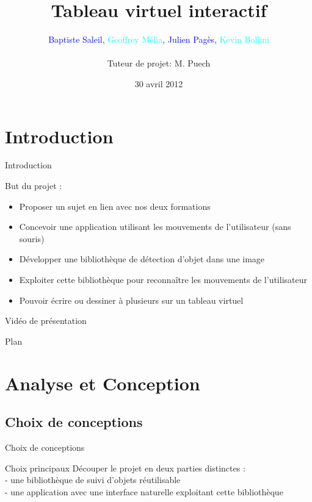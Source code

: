 \documentclass{beamer}
\title{Tableau virtuel interactif}
\author{\textcolor{blue}{Baptiste Saleil}, \textcolor{cyan}{Geoffrey Mélia}, \textcolor{blue}{Julien Pagès}, \textcolor{cyan}{Kevin Bollini} \\ \ \\Tuteur de projet: M. Puech}
\date{30 avril 2012}
\begin{document}
	\begin{frame}
		\titlepage
	\end{frame}

	\section{Introduction}
		\begin{frame}{Introduction}
		
	But du projet :
        \begin{itemize}
	\item Proposer un sujet en lien avec nos deux formations
	\item Concevoir une application utilisant les mouvements de l'utilisateur (sans souris)
	\item Développer une bibliothèque de détection d'objet dans une image
	\item Exploiter cette bibliothèque pour reconnaître les mouvements de l'utilisateur
	\item Pouvoir écrire ou dessiner à plusieurs sur un tableau virtuel
	\end{itemize}
            
	\end{frame}

      \begin{frame}{Vidéo de présentation}
      \end{frame}

      \begin{frame}{Plan}
            \tableofcontents
      \end{frame}
            
      \section{Analyse et Conception}
      \subsection{Choix de conceptions}
            \begin{frame}{Choix de conceptions}
                  \begin{block}{Choix principaux}
                        Découper le projet en deux parties distinctes : \\
                        - une bibliothèque de suivi d'objets réutilisable \\
                        - une application avec une interface naturelle exploitant cette bibliothèque \\
                  \end{block}
            \end{frame}
            
\end{document}
